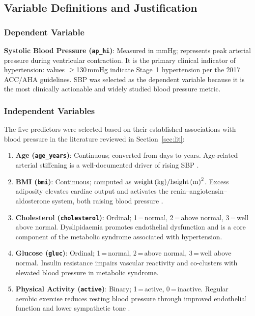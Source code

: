 ﻿\documentclass[conference]{IEEEtran}
\begin{document}
\subsection{Variable Definitions and Justification}

\subsubsection{Dependent Variable}
\textbf{Systolic Blood Pressure (\texttt{ap\_hi})}: Measured in mmHg; represents peak arterial pressure during ventricular contraction. It is the primary clinical indicator of hypertension: values $\geq$130\,mmHg indicate Stage~1 hypertension per the 2017 ACC/AHA guidelines. SBP was selected as the dependent variable because it is the most clinically actionable and widely studied blood pressure metric.

\subsubsection{Independent Variables}
The five predictors were selected based on their established associations with blood pressure in the literature reviewed in Section~\ref{sec:lit}:
\begin{enumerate}
  \item \textbf{Age (\texttt{age\_years})}: Continuous; converted from days to years. Age-related arterial stiffening is a well-documented driver of rising SBP \cite{linderman2018}.
  \item \textbf{BMI (\texttt{bmi})}: Continuous; computed as $\text{weight\,(kg)} / \text{height\,(m)}^2$. Excess adiposity elevates cardiac output and activates the renin--angiotensin--aldosterone system, both raising blood pressure \cite{cai2014}.
  \item \textbf{Cholesterol (\texttt{cholesterol})}: Ordinal; 1\,=\,normal, 2\,=\,above normal, 3\,=\,well above normal. Dyslipidaemia promotes endothelial dysfunction and is a core component of the metabolic syndrome associated with hypertension.
  \item \textbf{Glucose (\texttt{gluc})}: Ordinal; 1\,=\,normal, 2\,=\,above normal, 3\,=\,well above normal. Insulin resistance impairs vascular reactivity and co-clusters with elevated blood pressure in metabolic syndrome.
  \item \textbf{Physical Activity (\texttt{active})}: Binary; 1\,=\,active, 0\,=\,inactive. Regular aerobic exercise reduces resting blood pressure through improved endothelial function and lower sympathetic tone \cite{nihms2014}.
\end{enumerate}
\end{document}
